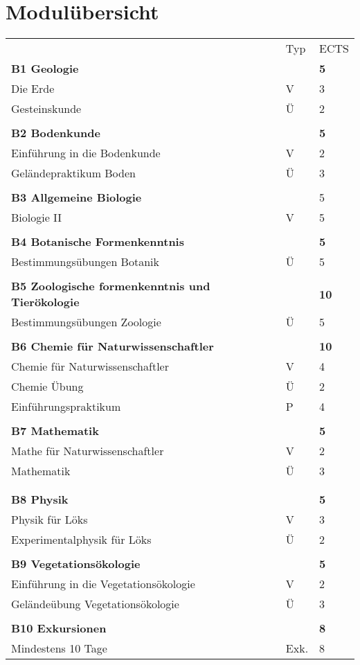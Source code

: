 \section{Modulübersicht}
\begin{longtable}{p{} p{} p{}}
 & Typ & ECTS \\ 
\textbf{B1 Geologie} & & \textbf{5}\\ 
Die Erde & V & 3\\
Gesteinskunde & Ü & 2\\
& &\\
\textbf{B2 Bodenkunde}& & \textbf{5}\\
Einführung in die Bodenkunde & V & 2\\
Geländepraktikum Boden & Ü & 3\\
& &\\
\textbf{B3 Allgemeine Biologie}& & 5\\
Biologie II & V &5\\
& &\\
\textbf{B4 Botanische Formenkenntnis} & & \textbf{5}\\
Bestimmungsübungen Botanik & Ü & 5\\
& &\\
\textbf{B5 Zoologische formenkenntnis und Tierökologie} & &\textbf{10}\\
Bestimmungsübungen Zoologie & Ü & 5\\
& &\\
\textbf{B6 Chemie für Naturwissenschaftler} & & \textbf{10}\\
Chemie für Naturwissenschaftler & V & 4\\
Chemie Übung & Ü & 2\\
Einführungspraktikum & P & 4 \\
&&\\
\textbf{B7 Mathematik} & &\textbf{5}\\
Mathe für Naturwissenschaftler & V & 2\\
Mathematik & Ü & 3\\
&&\\
&&\\
\textbf{B8 Physik} & & \textbf{5}\\
Physik für Löks & V & 3 \\
Experimentalphysik für Löks & Ü & 2\\
&&\\
\textbf{B9 Vegetationsökologie} & & \textbf{5}\\
Einführung in die Vegetationsökologie & V & 2 \\
Geländeübung Vegetationsökologie & Ü & 3\\
&&\\
\textbf{B10 Exkursionen}&&\textbf{8}\\
Mindestens 10 Tage & Exk. & 8\\


\end{longtable}
